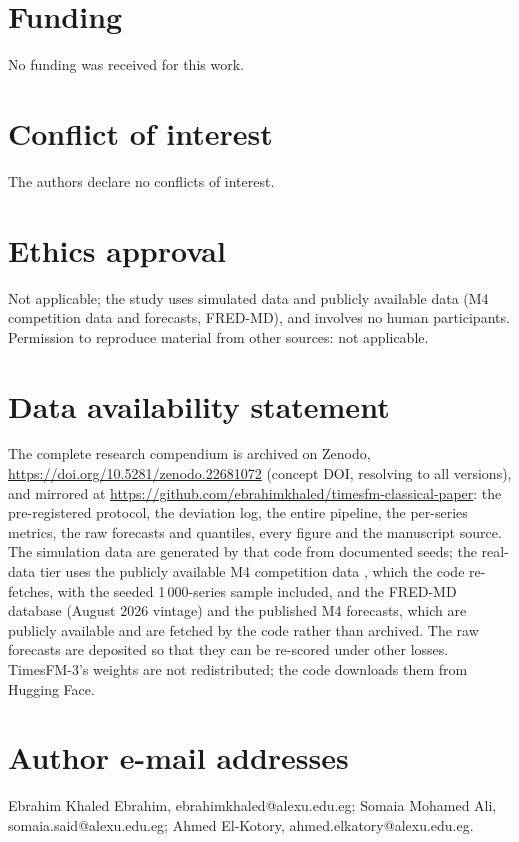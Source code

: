 \documentclass[ASNA]{USG}
\begin{document}
\section*{Funding}
No funding was received for this work.

\section*{Conflict of interest}
The authors declare no conflicts of interest.

\section*{Ethics approval}
Not applicable; the study uses simulated data and publicly available data (M4 competition data and
forecasts, FRED-MD), and
involves no human participants. Permission to reproduce material from other sources: not applicable.

\section*{Data availability statement}
The complete research compendium is archived on Zenodo, \url{https://doi.org/10.5281/zenodo.22681072} (concept DOI, resolving to all versions), and mirrored at \url{https://github.com/ebrahimkhaled/timesfm-classical-paper}: the pre-registered protocol, the deviation log, the entire pipeline, the per-series metrics, the raw forecasts and quantiles, every figure and the manuscript source. The simulation data are generated by that code from documented seeds; the real-data tier uses the publicly available M4 competition data \citep{makridakis2020m4}, which the code re-fetches, with the seeded 1\,000-series sample included, and the FRED-MD database (August 2026 vintage)
\citep{mccracken2016fredmd} and the published M4 forecasts, which are publicly available and are fetched
by the code rather than archived. The raw forecasts are deposited so that they can be re-scored under other losses. TimesFM-3's weights are not redistributed; the code downloads them from Hugging Face.

\section*{Author e-mail addresses}
Ebrahim Khaled Ebrahim, ebrahimkhaled@alexu.edu.eg; Somaia Mohamed Ali, somaia.said@alexu.edu.eg;
Ahmed El-Kotory, ahmed.elkatory@alexu.edu.eg.


\end{document}
